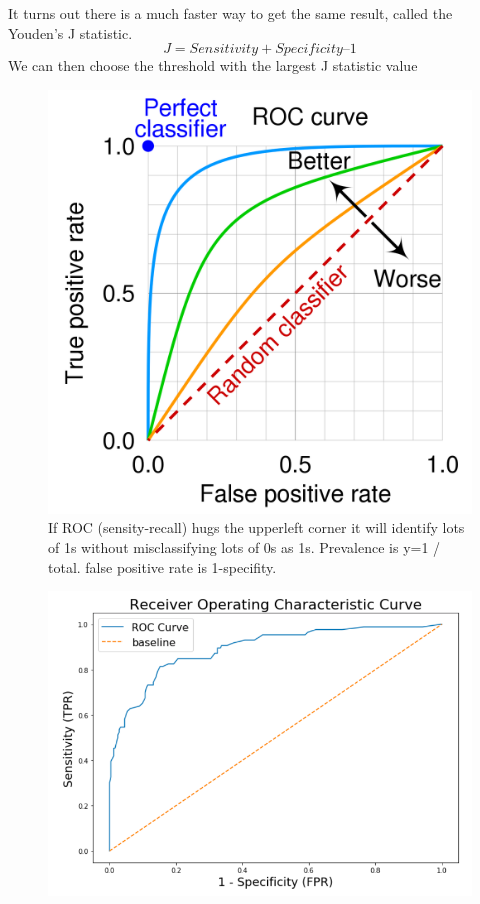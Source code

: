 \documentclass[12pt, a4paper]{book}
\begin{document}
It turns out there is a much faster way to get the same result, called the Youden’s J statistic.
\begin{equation}
	J = Sensitivity + Specificity – 1
\end{equation}
We can then choose the threshold with the largest J statistic value
\begin{figure}
	\centering
	\includegraphics[scale=0.2]{ROC.png}
	\caption{If ROC (sensity-recall) hugs the upperleft corner it will identify lots of 1s without misclassifying  lots of 0s as 1s. Prevalence is y=1 / total. false positive rate is 1-specifity.}
\end{figure}
\begin{figure}[H]
	\centering
	\includegraphics[scale=0.5]{ROC2.png}
\end{figure}
\end{document}

